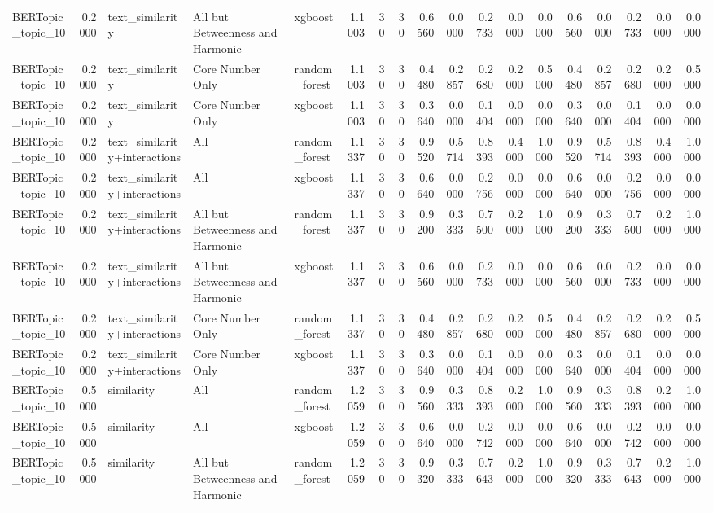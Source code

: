 \begin{tabular}{lrlllrrrrrrrrrrrrr}
BERTopic_topic_10 & 0.2000 & text_similarity & All but Betweenness and Harmonic & xgboost & 1.1003 & 30 & 30 & 0.6560 & 0.0000 & 0.2733 & 0.0000 & 0.0000 & 0.6560 & 0.0000 & 0.2733 & 0.0000 & 0.0000 \\
BERTopic_topic_10 & 0.2000 & text_similarity & Core Number Only & random_forest & 1.1003 & 30 & 30 & 0.4480 & 0.2857 & 0.2680 & 0.2000 & 0.5000 & 0.4480 & 0.2857 & 0.2680 & 0.2000 & 0.5000 \\
BERTopic_topic_10 & 0.2000 & text_similarity & Core Number Only & xgboost & 1.1003 & 30 & 30 & 0.3640 & 0.0000 & 0.1404 & 0.0000 & 0.0000 & 0.3640 & 0.0000 & 0.1404 & 0.0000 & 0.0000 \\
BERTopic_topic_10 & 0.2000 & text_similarity+interactions & All & random_forest & 1.1337 & 30 & 30 & 0.9520 & 0.5714 & 0.8393 & 0.4000 & 1.0000 & 0.9520 & 0.5714 & 0.8393 & 0.4000 & 1.0000 \\
BERTopic_topic_10 & 0.2000 & text_similarity+interactions & All & xgboost & 1.1337 & 30 & 30 & 0.6640 & 0.0000 & 0.2756 & 0.0000 & 0.0000 & 0.6640 & 0.0000 & 0.2756 & 0.0000 & 0.0000 \\
BERTopic_topic_10 & 0.2000 & text_similarity+interactions & All but Betweenness and Harmonic & random_forest & 1.1337 & 30 & 30 & 0.9200 & 0.3333 & 0.7500 & 0.2000 & 1.0000 & 0.9200 & 0.3333 & 0.7500 & 0.2000 & 1.0000 \\
BERTopic_topic_10 & 0.2000 & text_similarity+interactions & All but Betweenness and Harmonic & xgboost & 1.1337 & 30 & 30 & 0.6560 & 0.0000 & 0.2733 & 0.0000 & 0.0000 & 0.6560 & 0.0000 & 0.2733 & 0.0000 & 0.0000 \\
BERTopic_topic_10 & 0.2000 & text_similarity+interactions & Core Number Only & random_forest & 1.1337 & 30 & 30 & 0.4480 & 0.2857 & 0.2680 & 0.2000 & 0.5000 & 0.4480 & 0.2857 & 0.2680 & 0.2000 & 0.5000 \\
BERTopic_topic_10 & 0.2000 & text_similarity+interactions & Core Number Only & xgboost & 1.1337 & 30 & 30 & 0.3640 & 0.0000 & 0.1404 & 0.0000 & 0.0000 & 0.3640 & 0.0000 & 0.1404 & 0.0000 & 0.0000 \\
BERTopic_topic_10 & 0.5000 & similarity & All & random_forest & 1.2059 & 30 & 30 & 0.9560 & 0.3333 & 0.8393 & 0.2000 & 1.0000 & 0.9560 & 0.3333 & 0.8393 & 0.2000 & 1.0000 \\
BERTopic_topic_10 & 0.5000 & similarity & All & xgboost & 1.2059 & 30 & 30 & 0.6640 & 0.0000 & 0.2742 & 0.0000 & 0.0000 & 0.6640 & 0.0000 & 0.2742 & 0.0000 & 0.0000 \\
BERTopic_topic_10 & 0.5000 & similarity & All but Betweenness and Harmonic & random_forest & 1.2059 & 30 & 30 & 0.9320 & 0.3333 & 0.7643 & 0.2000 & 1.0000 & 0.9320 & 0.3333 & 0.7643 & 0.2000 & 1.0000 \\

\end{tabular}
